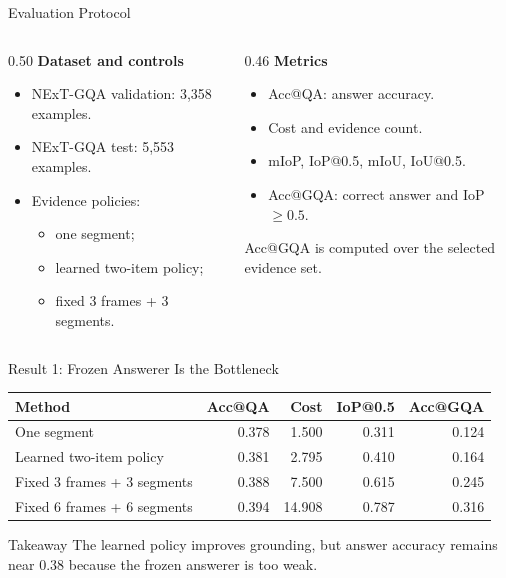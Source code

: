 \documentclass[aspectratio=169]{beamer}
\newcommand{\smalltab}{\scriptsize}
\begin{document}
\begin{frame}{Evaluation Protocol}
  \begin{columns}[T,onlytextwidth]
    \begin{column}{0.50\textwidth}
      \textbf{Dataset and controls}
      \begin{itemize}
        \item NExT-GQA validation: 3,358 examples.
        \item NExT-GQA test: 5,553 examples.
        \item Evidence policies:
          \begin{itemize}
            \item one segment;
            \item learned two-item policy;
            \item fixed 3 frames + 3 segments.
          \end{itemize}
      \end{itemize}
    \end{column}
    \begin{column}{0.46\textwidth}
      \textbf{Metrics}
      \begin{itemize}
        \item Acc@QA: answer accuracy.
        \item Cost and evidence count.
        \item mIoP, IoP@0.5, mIoU, IoU@0.5.
        \item Acc@GQA: correct answer and IoP $\geq 0.5$.
      \end{itemize}
      \vspace{0.3em}
      \footnotesize Acc@GQA is computed over the selected evidence set.
    \end{column}
  \end{columns}
\end{frame}

\begin{frame}{Result 1: Frozen Answerer Is the Bottleneck}
  \begin{table}
    \centering
    \smalltab
    \begin{tabular}{lrrrr}
      \toprule
      Method & Acc@QA & Cost & IoP@0.5 & Acc@GQA \\
      \midrule
      One segment & 0.378 & 1.500 & 0.311 & 0.124 \\
      Learned two-item policy & 0.381 & 2.795 & 0.410 & 0.164 \\
      Fixed 3 frames + 3 segments & 0.388 & 7.500 & 0.615 & 0.245 \\
      Fixed 6 frames + 6 segments & 0.394 & 14.908 & 0.787 & 0.316 \\
      \bottomrule
    \end{tabular}
  \end{table}

  \begin{block}{Takeaway}
    The learned policy improves grounding, but answer accuracy remains near 0.38 because the frozen answerer is too weak.
  \end{block}
\end{frame}
\end{document}

